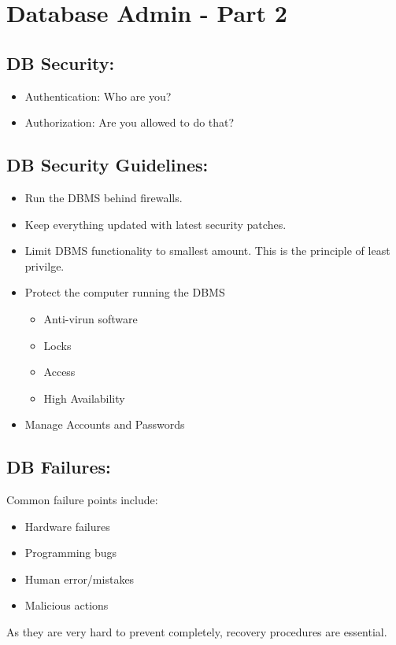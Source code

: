 \documentclass[a5paper]{article}
\begin{document}
	\section{Database Admin - Part 2}
	\subsection{DB Security:}
	\begin{itemize}
		\item Authentication: Who are you?
		\item Authorization: Are you allowed to do that?
	\end{itemize}
	\subsection{DB Security Guidelines:}
	\begin{itemize}
		\item Run the DBMS behind firewalls.
		\item Keep everything updated with latest security patches.
		\item Limit DBMS functionality to smallest amount. This is the principle of least privilge.
		\item Protect the computer running the DBMS
			\begin{itemize}
				\item Anti-virun software
				\item Locks
				\item Access
				\item High Availability
			\end{itemize}
		\item Manage Accounts and Passwords
	\end{itemize}
	\subsection{DB Failures:}
	Common failure points include:
	\begin{itemize}
		\item Hardware failures
		\item Programming bugs
		\item Human error/mistakes
		\item Malicious actions
	\end{itemize}
	As they are very hard to prevent completely, recovery procedures are essential.
\end{document}
